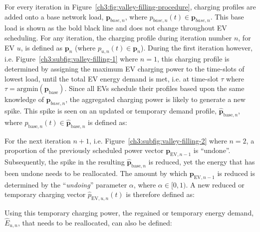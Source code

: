 For every iteration in Figure~\ref{ch3:fig:valley-filling-procedure}, charging profiles are added onto a base network load, $\textbf{p}_{base,n}$, where $p_{base,n}(t) \in \textbf{p}_{base,n}$.
This base load is shown as the bold black line and does not change throughout EV scheduling.
For any iteration, the charging profile during iteration number $n$, for EV $u$, is defined as $\textbf{p}_n$ (where $p_{u,n}(t) \in \textbf{p}_n$).
During the first iteration however, i.e. Figure~\ref{ch3:subfig:valley-filling-1} where $n=1$, this charging profile is determined by assigning the maximum EV charging power to the time-slots of lowest load, until the total EV energy demand is met, i.e. at time-slot $\tau$ where $\tau = \text{argmin}(\textbf{p}_\text{base})$.
Since all EVs schedule their profiles based upon the same knowledge of $\textbf{p}_{base,n}$, the aggregated charging power is likely to generate a new spike.
This spike is seen on an updated or temporary demand profile, $\hat{\textbf{p}}_{\text{base}, n}$, where $\hat{p}_{\text{base}, n}(t) \in \hat{\textbf{p}}_{\text{base}, n}$ is defined as:




For the next iteration $n+1$, i.e. Figure~\ref{ch3:subfig:valley-filling-2} where $n=2$, a proportion of the previously scheduled power vector $\textbf{p}_{\text{EV},n-1}$ is ``undone''.
Subsequently, the spike in the resulting $\hat{\textbf{p}}_{\text{base}, n}$ is reduced, yet the energy that has been undone needs to be reallocated.
The amount by which $\textbf{p}_{\text{EV},n-1}$ is reduced is determined by the ``\textit{undoing}'' parameter $\alpha$, where $\alpha \in [0, 1)$.
A new reduced or temporary charging vector $\hat{p}_{\text{EV}, u, n}(t)$ is therefore defined as:



Using this temporary charging power, the regained or temporary energy demand, $\hat{E}_{u,n}$, that needs to be reallocated, can also be defined:



